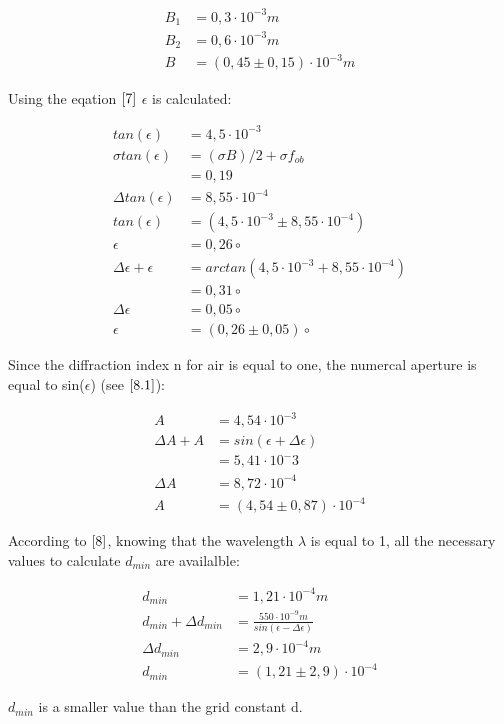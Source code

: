\begin{align*}
    B_{1} & = 0,3 \cdot 10^{-3} m \\
    B_{2} & = 0,6 \cdot 10^{-3} m \\
    B &= (0,45 \pm 0,15) \cdot 10^{-3} m
\end{align*}

Using the eqation $\ref{7}$ $\epsilon$ is calculated:

\begin{align*}
    tan(\epsilon) & = 4,5 \cdot 10^{-3} \\
    \sigma tan(\epsilon) &= (\sigma B)/2 + \sigma f_{ob} \\
    &= 0,19 \\
    \Delta tan(\epsilon) &= 8,55 \cdot 10^{-4}  \\
    tan(\epsilon) & = (4,5 \cdot 10^{-3} \pm 8,55 \cdot 10^{-4}) \\
    \epsilon &= 0,26 \circ \\
    \Delta \epsilon + \epsilon &= arctan(4,5 \cdot 10^{-3} + 8,55 \cdot 10^{-4}) \\
    &= 0,31 \circ \\
    \Delta \epsilon &= 0,05 \circ \\
    \epsilon &= (0,26 \pm 0,05) \circ
\end{align*}

Since the diffraction index n for air is equal to one, the numercal aperture is equal to sin($\epsilon$) (see $\ref{8.1}$):

\begin{align*}
    A & = 4,54 \cdot 10^{-3} \\
  \Delta A + A & = sin(\epsilon + \Delta \epsilon) \\
  &= 5,41 \cdot 10^-3 \\
    \Delta A &= 8,72 \cdot 10^{-4} \\
    A & = (4,54 \pm 0,87 ) \cdot 10^{-4}
\end{align*}

According to $\ref{8}$, knowing that the wavelength $\lambda$ is equal to 1, all the necessary values to calculate 
$d_{min}$ are availalble:

\begin{align*}
    d_{min} & = 1,21 \cdot 10^{-4} m \\
    d_{min} + \Delta d_{min} & = \frac{550 \cdot 10^{-9} m}{sin(\epsilon - \Delta \epsilon)} \\
    \Delta d_{min} &= 2,9 \cdot 10^{-4} m \\
    d_{min} & = (1,21 \pm 2,9) \cdot 10^{-4}
\end{align*}

$d_{min}$ is a smaller value than the grid constant d.

  \newpage
